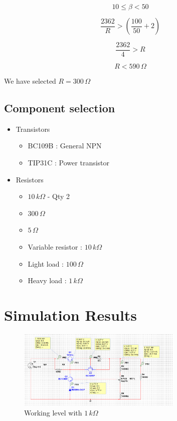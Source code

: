 \documentclass[12pt, a4paper]{article}
\begin{document}
\begin{equation*}
10 \leq \beta < 50
\end{equation*}

\begin{equation*}
\frac{2362}{R} > \left(\frac{100}{50} + 2\right)
\end{equation*}

\begin{equation*}
\frac{2362}{4} > R
\end{equation*}

\begin{equation*}
R < 590\,\Omega
\end{equation*}

We have selected $ R = 300\,\Omega$

\subsection{Component selection}

\begin{itemize}
    \item Transistors \begin{itemize}
            \item BC109B : General NPN
            \item TIP31C : Power transistor
        \end{itemize}
    \item Resistors \begin{itemize}
            \item $10\,k\Omega$ - Qty 2
            \item $300\,\Omega$
            \item $5\,\Omega$
            \item Variable resistor : $10\,k\Omega$
            \item Light load : $100\,\Omega$
            \item Heavy load : $1\,k\Omega$
        \end{itemize}
\end{itemize}

\section{Simulation Results}

\begin{figure}[h!]
\centering
    \includegraphics[width=0.7\textwidth]{lps workding.PNG}
    \caption*{Working level with $1\,k\Omega$}
\end{figure}
\end{document}
